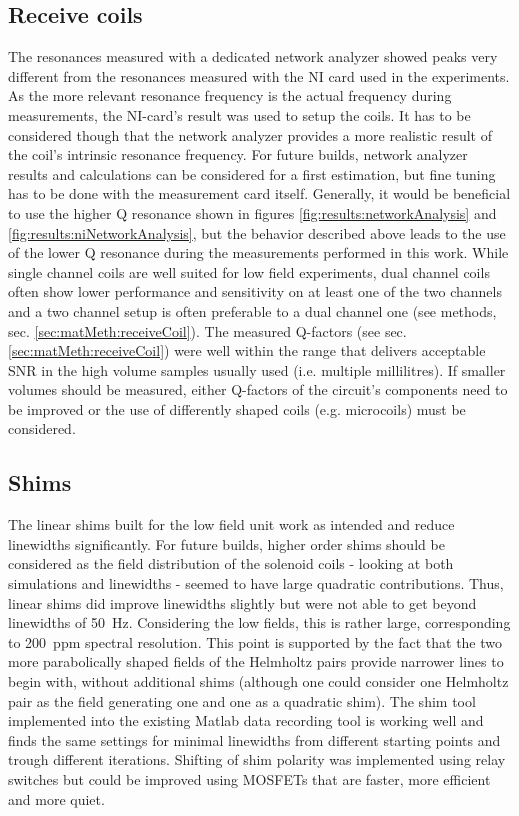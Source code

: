         \subsection{Receive coils}
            The resonances measured with a dedicated network analyzer showed peaks very different from the resonances measured with the NI card used in the experiments. As the more relevant resonance frequency is the actual frequency during measurements, the NI-card's result was used to setup the coils. It has to be considered though that the network analyzer provides a more realistic result of the coil's intrinsic resonance frequency. For future builds, network analyzer results and calculations can be considered for a first estimation, but fine tuning has to be done with the measurement card itself. Generally, it would be beneficial to use the higher Q resonance shown in figures \ref{fig:results:networkAnalysis} and \ref{fig:results:niNetworkAnalysis}, but the behavior described above leads to the use of the lower Q resonance during the measurements performed in this work.
            While single channel coils are well suited for low field experiments, dual channel coils often show lower performance and sensitivity on at least one of the two channels and a two channel setup is often preferable to a dual channel one (see methods, sec. \ref{sec:matMeth:receiveCoil}). The measured Q-factors (see sec. \ref{sec:matMeth:receiveCoil}) were well within the range that delivers acceptable SNR in the high volume samples usually used (i.e. multiple millilitres). If smaller volumes should be measured, either Q-factors of the circuit's components need to be improved or the use of differently shaped coils (e.g. microcoils) must be considered.
        \subsection{Shims}
            The linear shims built for the low field unit work as intended and reduce linewidths significantly. For future builds, higher order shims should be considered as the field distribution of the solenoid coils - looking at both simulations and linewidths - seemed to have large quadratic contributions. Thus, linear shims did improve linewidths slightly but were not able to get beyond linewidths of \SI{50}{\hertz}. Considering the low fields, this is rather large, corresponding to 200~ppm spectral resolution. This point is supported by the fact that the two more parabolically shaped fields of the Helmholtz pairs provide narrower lines to begin with, without additional shims (although one could consider one Helmholtz pair as the field generating one and one as a quadratic shim). The shim tool implemented into the existing Matlab data recording tool is working well and finds the same settings for minimal linewidths from different starting points and trough different iterations. Shifting of shim polarity was implemented using relay switches but could be improved using MOSFETs that are faster, more efficient and more quiet.
